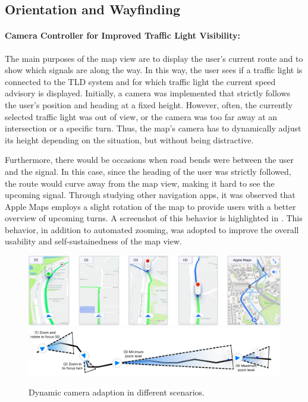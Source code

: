 \subsection{Orientation and Wayfinding}

\paragraph{Camera Controller for Improved Traffic Light Visibility:} The main purposes of the map view are to display the user's current route and to show which signals are along the way. In this way, the user sees if a traffic light is connected to the TLD system and for which traffic light the current speed advisory is displayed. Initially, a camera was implemented that strictly follows the user's position and heading at a fixed height. However, often, the currently selected traffic light was out of view, or the camera was too far away at an intersection or a specific turn. Thus, the map's camera has to dynamically adjust its height depending on the situation, but without being distractive.

Furthermore, there would be occasions when road bends were between the user and the signal. In this case, since the heading of the user was strictly followed, the route would curve away from the map view, making it hard to see the upcoming signal. Through studying other navigation apps, it was observed that Apple Maps employs a slight rotation of the map to provide users with a better overview of upcoming turns. A screenshot of this behavior is highlighted in . This behavior, in addition to automated zooming, was adopted to improve the overall usability and self-sustainedness of the map view.

\begin{figure}[htbp]
\centering
\includegraphics[width=\linewidth]{images/camera-controller-1.png}
\includegraphics[width=\linewidth]{images/camera-controller-2.pdf}
\caption{Dynamic camera adaption in different scenarios.}
\label{fig:camera-controller}
\end{figure}

